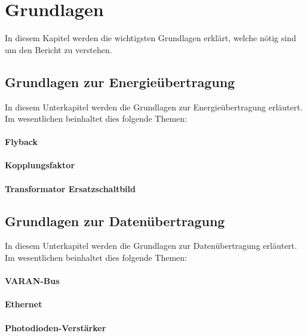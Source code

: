 \section{Grundlagen}
In diesem Kapitel werden die wichtigsten Grundlagen erklärt, welche nötig sind um den Bericht zu verstehen.
\subsection{Grundlagen zur Energieübertragung}
In diesem Unterkapitel werden die Grundlagen zur Energieübertragung erläutert. Im wesentlichen beinhaltet dies folgende Themen:
\paragraph{Flyback}
\paragraph{Kopplungsfaktor}
\paragraph{Transformator Ersatzschaltbild}

\subsection{Grundlagen zur Datenübertragung}
In diesem Unterkapitel werden die Grundlagen zur Datenübertragung erläutert. Im wesentlichen beinhaltet dies folgende Themen:
\paragraph{VARAN-Bus}
\paragraph{Ethernet}
\paragraph{Photodioden-Verstärker}